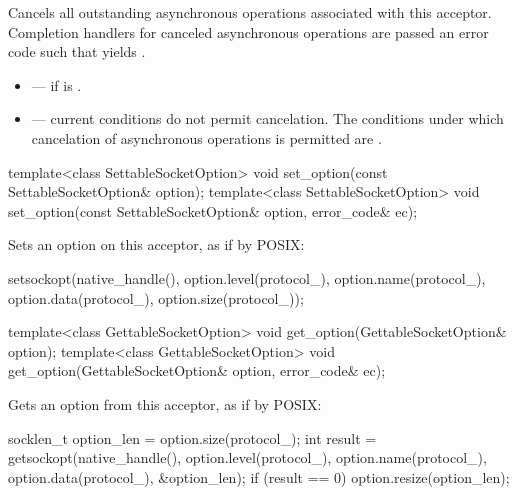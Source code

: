 \begin{itemdescr}
\pnum
\effects Cancels all outstanding asynchronous operations associated with this acceptor. Completion handlers for canceled asynchronous operations are passed an error code  such that  yields .

\pnum
\errors
\begin{itemize}
\item
{} --- if  is .
\item
{} --- current conditions do not permit cancelation. The conditions under which cancelation of asynchronous operations is permitted are .
\end{itemize}
\end{itemdescr}

\begin{itemdecl}
template<class SettableSocketOption>
  void set_option(const SettableSocketOption& option);
template<class SettableSocketOption>
  void set_option(const SettableSocketOption& option, error_code& ec);
\end{itemdecl}

\begin{itemdescr}
\pnum
\effects Sets an option on this acceptor, as if by POSIX:
\begin{codeblock}
setsockopt(native_handle(), option.level(protocol_), option.name(protocol_),
           option.data(protocol_), option.size(protocol_));
\end{codeblock}
\end{itemdescr}

\begin{itemdecl}
template<class GettableSocketOption>
  void get_option(GettableSocketOption& option);
template<class GettableSocketOption>
  void get_option(GettableSocketOption& option, error_code& ec);
\end{itemdecl}

\begin{itemdescr}
\pnum
\effects Gets an option from this acceptor, as if by POSIX:
\begin{codeblock}
socklen_t option_len = option.size(protocol_);
int result = getsockopt(native_handle(), option.level(protocol_),
                        option.name(protocol_), option.data(protocol_),
                        &option_len);
if (result == 0)
  option.resize(option_len);
\end{codeblock}

\end{itemdescr}

